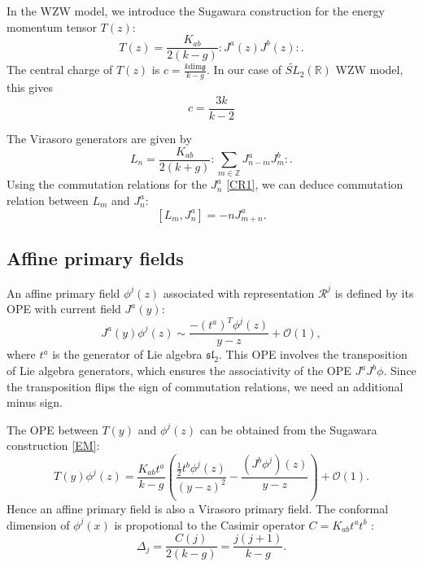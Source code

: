 \documentclass[10pt,a4paper]{article}
\numberwithin{equation}{section}
\begin{document}
In the WZW model, we introduce the Sugawara construction for the energy momentum tensor $T(z)$: 
\begin{equation}
    \boxed{
        T(z) = \frac{K_{ab}}{2(k-g)} : J^{a}(z) J^{b}(z) : . \label{EM}
        } 
\end{equation}
The central charge of $T(z)$ is $c = \frac{k \mathrm{dim} \mathfrak{g}}{k-g}$. In our case of $\widetilde{SL}_{2}(\mathbb{R})$ 
WZW model, this gives 
\begin{equation}
    \boxed{
        c = \frac{3k}{k-2}
        }
\end{equation}

The Virasoro generators are given by
\begin{equation}
    L_{n} = \frac{K_{ab}}{2(k+g)} : \sum_{m \in \mathbb{Z} } J^{a}_{n-m} J^{b}_{m} :. \label{DefLn}
\end{equation}
Using the commutation relations for the $J^{a}_{n}$ \eqref{CR1}, we can deduce commutation relation between $L_{m}$ and $J^{a}_{n}$:
\begin{equation}
    \boxed{
            \left[ L_{m}, J^{a}_{n} \right] = -n J^{a}_{m+n}. \label{CR2}
    }
\end{equation}

\subsection{Affine primary fields}
An affine primary field $\phi^{j}(z)$ associated with representation $\mathcal{R}^{j}$ is defined by its OPE with current field 
$J^{a}(y)$:
\begin{equation}
    \boxed{
        J^{a}(y) \phi^{j}(z) \sim \frac{-(t^{a})^{T} \phi^{j}(z)}{y-z} + \mathcal{O}(1), \label{OPEJPhi}
    }
\end{equation}
where $t^{a}$ is the generator of Lie algebra $\mathfrak{sl}_{2}$. This OPE involves the transposition of Lie algebra generators, which 
ensures the associativity of the OPE $J^{a}J^{b} \phi$. Since the transposition flips the sign of commutation relations, we need an additional 
minus sign.

The OPE between $T(y)$ and $\phi^{j}(z)$ can be obtained from the Sugawara construction \eqref{EM}:
\begin{equation}
    T(y) \phi^{j}(z) = \frac{K_{ab} t^{a}}{k-g} \left( \frac{\frac{1}{2} t^{b} \phi^{j}(z)}{(y-z)^{2}} - \frac{\left(J^{b} \phi^{j}\right)(z)}{y-z} \right) + \mathcal{O}(1).
\end{equation}
Hence an affine primary field is also a Virasoro primary field. 
The conformal dimension of $\phi^{j}(x)$ is propotional to the Casimir operator $C = K_{ab} t^{a} t^{b}$ :
\begin{equation}
    \boxed{
        \Delta_{j} = \frac{C(j)}{2(k-g)} = \frac{j(j+1)}{k-g}.
    }
\end{equation}
\end{document}
